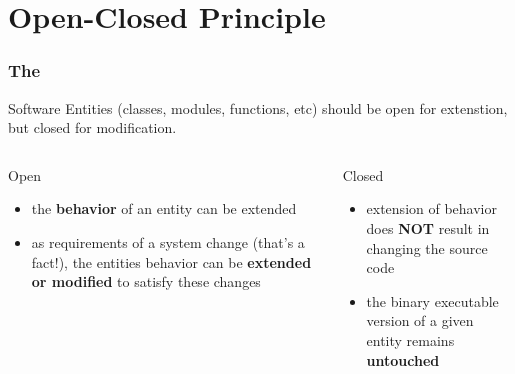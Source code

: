 \documentclass[9pt,handout]{beamer}
\begin{document}
\section{Open-Closed Principle}
\begin{frame}
  \frametitle{The \secname}
  \begin{theorem}
    Software Entities (classes, modules, functions, etc) should be open for extenstion, but closed for modification.
  \end{theorem}
\vfill
\pause
  \begin{columns}[t]
    \begin{column}{.48\textwidth}
       \begin{block}{Open}
         \begin{itemize}
         \item<3-> the \textbf{behavior} of an entity can be extended
         \item<3-> as requirements of a system change (that's a fact!), the entities behavior can be \textbf{extended or modified} to satisfy these changes
         \end{itemize}
       \end{block}
    \end{column}
\hfill
    \begin{column}{.48\textwidth}
       \begin{block}{Closed}
         \begin{itemize}
         \item<4-> extension of behavior does \textbf{NOT} result in changing the source code 
         \item<4-> the binary executable version of a given entity remains \textbf{untouched}
         \end{itemize}
      \end{block}
    \end{column}
  \end{columns}

\end{frame}
\end{document}
